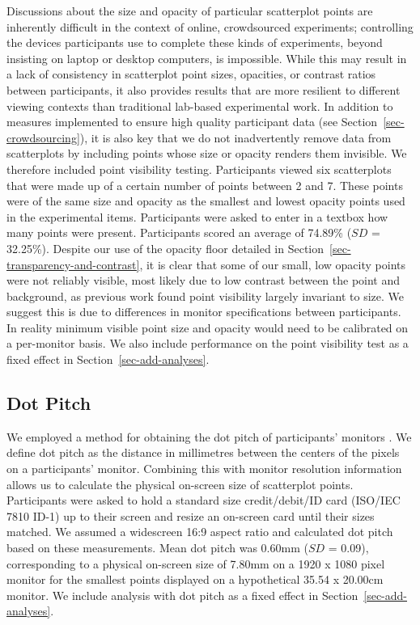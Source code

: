 \documentclass[manuscript, review, anonymous, screen]{acmart}
\begin{document}
Discussions about the size and opacity of particular scatterplot points
are inherently difficult in the context of online, crowdsourced
experiments; controlling the devices participants use to complete these
kinds of experiments, beyond insisting on laptop or desktop computers,
is impossible. While this may result in a lack of consistency in
scatterplot point sizes, opacities, or contrast ratios between
participants, it also provides results that are more resilient to
different viewing contexts than traditional lab-based experimental work.
In addition to measures implemented to ensure high quality participant
data (see Section~\ref{sec-crowdsourcing}), it is also key that we do
not inadvertently remove data from scatterplots by including points
whose size or opacity renders them invisible. We therefore included
point visibility testing. Participants viewed six scatterplots that were
made up of a certain number of points between 2 and 7. These points were
of the same size and opacity as the smallest and lowest opacity points
used in the experimental items. Participants were asked to enter in a
textbox how many points were present. Participants scored an average of
74.89\% (\(SD\) = 32.25\%). Despite our use of the opacity floor
detailed in Section~\ref{sec-transparency-and-contrast}, it is clear
that some of our small, low opacity points were not reliably visible,
most likely due to low contrast between the point and background, as
previous work \citep{strain_2023b} found point visibility largely
invariant to size. We suggest this is due to differences in monitor
specifications between participants. In reality minimum visible point
size and opacity would need to be calibrated on a per-monitor basis. We
also include performance on the point visibility test as a fixed effect
in Section~\ref{sec-add-analyses}.

\hypertarget{sec-dot-pitch}{%
\subsection{Dot Pitch}\label{sec-dot-pitch}}

We employed a method for obtaining the dot pitch of participants'
monitors \citep{screenscale}. We define dot pitch as the distance in
millimetres between the centers of the pixels on a participants'
monitor. Combining this with monitor resolution information allows us to
calculate the physical on-screen size of scatterplot points.
Participants were asked to hold a standard size credit/debit/ID card
(ISO/IEC 7810 ID-1) up to their screen and resize an on-screen card
until their sizes matched. We assumed a widescreen 16:9 aspect ratio and
calculated dot pitch based on these measurements. Mean dot pitch was
0.60mm (\(SD\) = 0.09), corresponding to a physical on-screen size of
7.80mm on a 1920 x 1080 pixel monitor for the smallest points displayed
on a hypothetical 35.54 x 20.00cm monitor. We include analysis with dot
pitch as a fixed effect in Section~\ref{sec-add-analyses}.
\end{document}

